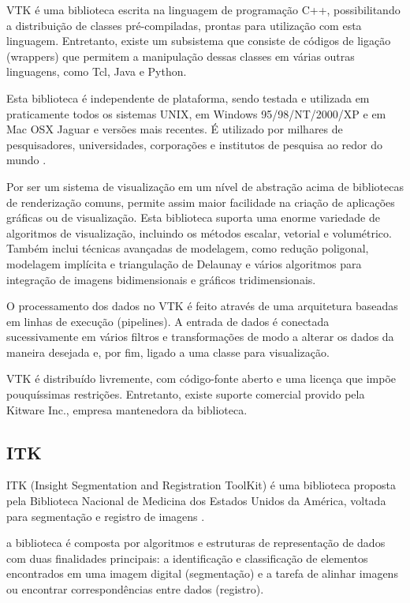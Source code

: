 VTK é uma biblioteca escrita na linguagem de programação C++, possibilitando a distribuição de classes pré-compiladas, prontas para utilização com esta linguagem. Entretanto, existe um subsistema que consiste de códigos de ligação (wrappers) que permitem a manipulação dessas classes em várias outras linguagens, como Tcl, Java e Python.

Esta biblioteca é independente de plataforma, sendo testada e utilizada em praticamente todos os sistemas UNIX, em Windows 95/98/NT/2000/XP e em Mac OSX Jaguar e versões mais recentes. É utilizado por milhares de pesquisadores, universidades, corporações e institutos de pesquisa ao redor do mundo \cite{vtk-page}.

Por ser um sistema de visualização em um nível de abstração acima de bibliotecas de renderização comuns, permite assim maior facilidade na criação de aplicações gráficas ou de visualização. Esta biblioteca suporta uma enorme variedade de algoritmos de visualização, incluindo os métodos escalar, vetorial e volumétrico. Também inclui técnicas avançadas de modelagem, como redução poligonal, modelagem implícita e triangulação de Delaunay e vários algoritmos para integração de imagens bidimensionais e gráficos tridimensionais.

O processamento dos dados no VTK é feito através de uma arquitetura baseadas em linhas de execução (pipelines). A entrada de dados é conectada sucessivamente em vários filtros e transformações de modo a alterar os dados da maneira desejada e, por fim, ligado a uma classe para visualização.

VTK é distribuído livremente, com código-fonte aberto e uma licença que impõe pouquíssimas restrições. Entretanto, existe suporte comercial provido pela Kitware Inc., empresa mantenedora da biblioteca.

\subsection{ITK}

ITK (Insight Segmentation and Registration ToolKit) é uma biblioteca proposta pela Biblioteca Nacional de Medicina dos Estados Unidos da América, voltada para segmentação e registro de imagens \cite{yoo}.

a biblioteca é composta por algoritmos e estruturas de representação de dados com duas finalidades principais: a identificação e classificação de elementos encontrados em uma imagem digital (segmentação) e a tarefa de alinhar imagens ou encontrar correspondências entre dados (registro).

